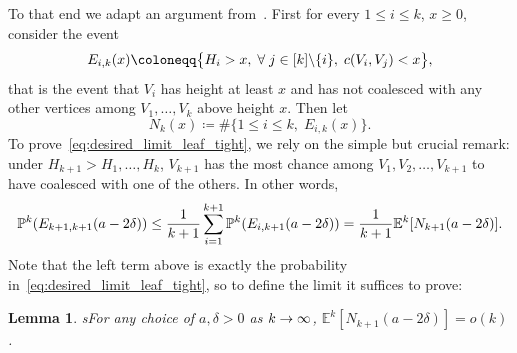 \documentclass[10pt]{amsart}
\newtheorem{lemm}[theo]{Lemma}\newtheorem{prop}[theo]{Proposition}\newtheorem{coro}[theo]{Corollary}\newtheorem{conj}[theo]{Conjecture}
\theoremstyle{definition}\newtheorem{defi}[theo]{Definition}\newtheorem{rema}[theo]{Remark}\newtheorem{exam}[theo]{Example}\newtheorem{exem}[theo]{Example}\newtheorem{nota}[theo]{Notation}
\newcommand{\probak}[1]{\mathbb{P}^k\left(#1\right)}
\newcommand{\E}{\mathbb{E}}
\newcommand{\1}{\mathbbm{1}}
\let\originalleft\left
\let\originalright\right
\renewcommand{\left}{\mathopen{}\mathclose\bgroup\originalleft}
\renewcommand{\right}{\aftergroup\egroup\originalright}
\renewcommand*{\to}{\mathchoice{\longrightarrow}{\rightarrow}{\rightarrow}{\rightarrow}}
\let\oldforall\forall
\renewcommand*{\forall}{\mathrel{\oldforall}}
\begin{document}
To that end we adapt an argument from~\cite[Section~6.5]{BBKKbis23+}. First for every $1\leq i\leq k$, $x\geq 0$, consider the event
\[
E_{i,k}(x)\coloneqq \bigl\{H_i>x, \;\forall j\in [k]\backslash \{i\}, \; c\left(V_i,V_j\right)<x\bigr\},
\]
that is the event that $V_i$ has height at least $x$ and has not coalesced with any other vertices among $V_1,\dots, V_k$ above height $x$. Then let
\[
N_k(x)\coloneqq\#\{1\leq i \leq k,\; E_{i,k}(x) \}.
\]
To prove~\eqref{eq:desired_limit_leaf_tight}, we rely on the simple but crucial remark: under $H_{k+1}>H_1,\dots, H_k$, $V_{k+1}$ has the most chance among $V_1,V_2,\dots, V_{k+1}$ to have coalesced with one of the others. In other words,
\[
\probak{E_{k+1,k+1}(a-2\delta)} \leq \frac{1}{k+1}\sum_{i=1}^{k+1} \probak{E_{i,k+1}(a-2\delta)} = \frac{1}{k+1} \E^k\left [N_{k+1}(a-2\delta)\right].
\]
Note that the left term above is exactly the probability in~\eqref{eq:desired_limit_leaf_tight}, so to define the limit it suffices to prove:

\begin{lemm}s\label{lem:end_lim_leaf-tight}
For any choice of $a,\delta>0$ as $k\to \infty$, $\E^k[N_{k+1}(a-2\delta)]=o(k)$.
\end{lemm}
\end{document}

